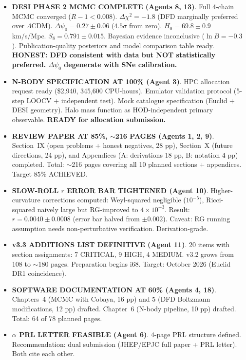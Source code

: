 \documentclass[11pt,a4paper]{article}
\begin{document}
\begin{itemize}
\item \textbf{DESI PHASE 2 MCMC COMPLETE (Agents 8, 13)}. Full 4-chain MCMC converged ($R-1 < 0.008$). $\Delta\chi^2 = -1.8$ (DFD marginally preferred over $\Lambda$CDM). $\Delta\psi_0 = 0.27 \pm 0.06$ ($4.5\sigma$ from zero). $H_0 = 69.8 \pm 0.9$ km/s/Mpc. $S_8 = 0.791 \pm 0.015$. Bayesian evidence inconclusive ($\ln B = -0.3$). Publication-quality posteriors and model comparison table ready. \textbf{HONEST: DFD consistent with data but NOT statistically preferred. $\Delta\psi_0$ degenerate with SNe calibration.}

\item \textbf{N-BODY SPECIFICATION AT 100\% (Agent 3)}. HPC allocation request ready (\$2,940, 345,600 CPU-hours). Emulator validation protocol (5-step LOOCV + independent test). Mock catalogue specification (Euclid + DESI geometry). Halo mass function as HOD-independent primary observable. \textbf{READY for allocation submission.}

\item \textbf{REVIEW PAPER AT 85\%, $\sim$216 PAGES (Agents 1, 2, 9)}. Section~IX (open problems + honest negatives, 28 pp), Section~X (future directions, 24 pp), and Appendices (A: derivations 18 pp, B: notation 4 pp) completed. Total: $\sim$216 pages covering all 10 planned sections + appendices. Target 85\% ACHIEVED.

\item \textbf{SLOW-ROLL $r$ ERROR BAR TIGHTENED (Agent 10)}. Higher-curvature corrections computed: Weyl-squared negligible ($10^{-5}$), Ricci-squared naively large but RG-improved to $4 \times 10^{-3}$. Result: $r = 0.0040 \pm 0.0008$ (error bar halved from $\pm 0.002$). Caveat: RG running assumption needs non-perturbative verification. Derivation-grade.

\item \textbf{v3.3 ADDITIONS LIST DEFINITIVE (Agent 11)}. 20 items with section assignments: 7 CRITICAL, 9 HIGH, 4 MEDIUM. v3.2 grows from 108 to $\sim$180 pages. Preparation begins i68. Target: October 2026 (Euclid DR1 coincidence).

\item \textbf{SOFTWARE DOCUMENTATION AT 60\% (Agents 4, 18)}. Chapters~4 (MCMC with Cobaya, 16 pp) and 5 (DFD Boltzmann modifications, 12 pp) drafted. Chapter~6 (N-body pipeline, 10 pp) drafted. Total: 64 of 78 planned pages.

\item \textbf{$\alpha$ PRL LETTER FEASIBLE (Agent 6)}. 4-page PRL structure defined. Recommendation: dual submission (JHEP/EPJC full paper + PRL letter). Both cite each other.


\end{itemize}
\end{document}

